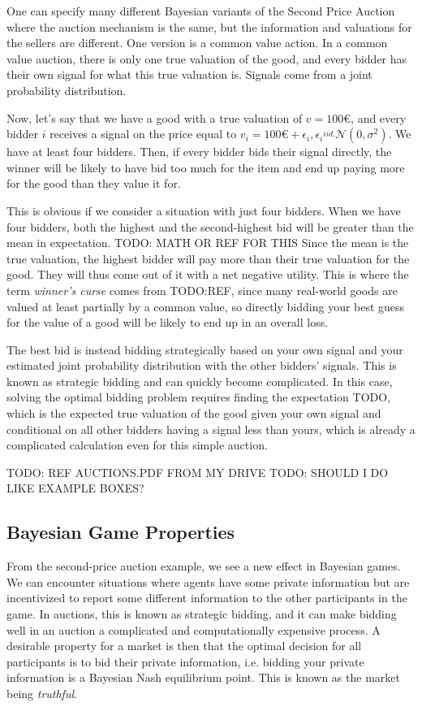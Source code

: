 One can specify many different Bayesian variants of the Second Price Auction
where the auction mechanism is the same, but the information and valuations for
the sellers are different. One version is a common value action. In a common
value auction, there is only one true valuation of the good, and every bidder
has their own signal for what this true valuation is. Signals come from a joint
probability distribution.

Now, let's say that we have a good with a true valuation of $v=100€$, and every
bidder $i$ receives a signal on the price equal to $v_i = 100€ + \epsilon_i,
\epsilon_i \overset{iid.}{~} \mathcal N(0,\sigma^2)$. We have at least four
bidders. Then, if every bidder bids their signal directly, the winner will be
likely to have bid too much for the item and end up paying more for the good
than they value it for.

This is obvious if we consider a situation with just four bidders. When we have
four bidders, both the highest and the second-highest bid will be greater than
the mean in expectation. TODO: MATH OR REF FOR THIS Since the mean is the true
valuation, the highest bidder will pay more than their true valuation for the
good. They will thus come out of it with a net negative utility. This is where
the term \emph{winner's curse} comes from TODO:REF, since many real-world goods
are valued at least partially by a common value, so directly bidding your best
guess for the value of a good will be likely to end up in an overall loss.

The best bid is instead bidding strategically based on your own signal and your
estimated joint probability distribution with the other bidders' signals. This
is known as strategic bidding and can quickly become complicated.
In this case, solving the optimal bidding problem requires finding the
expectation TODO, which is the expected true valuation of the good given your
own signal and conditional on all other bidders having a signal less than
yours, which is already a complicated calculation even for this simple auction.

TODO: REF AUCTIONS.PDF FROM MY DRIVE
TODO: SHOULD I DO LIKE EXAMPLE BOXES?

\subsection{Bayesian Game Properties}

From the second-price auction example, we see a new effect in Bayesian games.
We can encounter situations where agents have some private information but are
incentivized to report some different information to the other participants in
the game. In auctions, this is known as strategic bidding, and it can make
bidding well in an auction a complicated and computationally expensive process.
A desirable property for a market is then that the optimal decision for all
participants is to bid their private information, i.e. bidding your private
information is a Bayesian Nash equilibrium point. This is known as the market
being \emph{truthful}.

